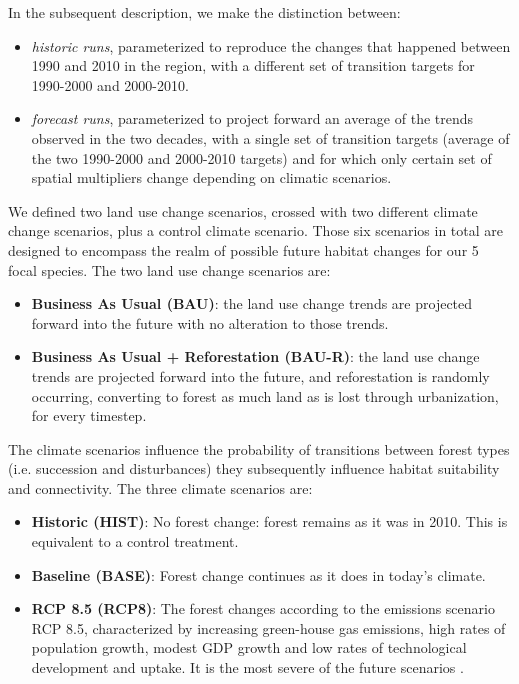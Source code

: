 In the subsequent description, we make the distinction between:
\begin{itemize}
\item{\textit{historic runs}}, parameterized to reproduce the changes that happened between 1990 and 2010 in the region, with a different set of transition targets for 1990-2000 and 2000-2010.
\item{\textit{forecast runs}}, parameterized to project forward an average of the trends observed in the two decades, with a single set of transition targets (average of the two 1990-2000 and 2000-2010 targets) and for which only certain set of spatial multipliers change depending on climatic scenarios.
\end{itemize}
We defined two land use change scenarios, crossed with two different climate change scenarios, plus a control climate scenario. Those six scenarios in total are designed to  encompass the realm of possible future habitat changes for our 5 focal species.
The two land use change scenarios are:
\begin{itemize}
\item{\textbf{Business As Usual (BAU)}}: the land use change trends are projected forward into the future with no alteration to those trends.
\item {\textbf{Business As Usual + Reforestation (BAU-R)}}: the land use change trends are projected forward into the future, and reforestation is randomly occurring, converting to forest as much land as is lost through urbanization, for every timestep.
\end{itemize}
The climate scenarios influence the probability of transitions between forest types (i.e. succession and disturbances) they subsequently influence habitat suitability and connectivity. The three climate scenarios are:
\begin{itemize}
\item{\textbf{Historic (HIST)}}: No forest change: forest remains as it was in 2010. This is equivalent to a control treatment.
\item{\textbf{Baseline (BASE)}}: Forest change continues as it does in today's climate.
\item{\textbf{RCP 8.5 (RCP8)}}: The forest changes according to the emissions scenario RCP 8.5, characterized by increasing green-house gas emissions, high rates of population growth, modest GDP growth and low rates of technological development and uptake. It is the most severe of the future scenarios \citep{ipcc_summary_2013}.\\
\end{itemize}

